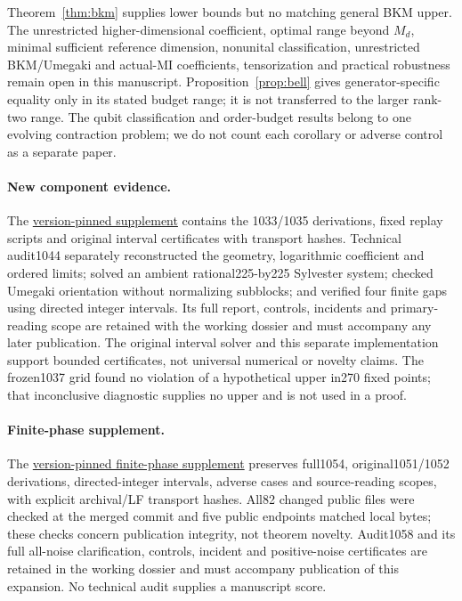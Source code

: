 Theorem~\ref{thm:bkm} supplies lower bounds but no matching general BKM upper. The unrestricted higher-dimensional coefficient, optimal range beyond \(M_d\), minimal sufficient reference dimension, nonunital classification, unrestricted BKM/Umegaki and actual-MI coefficients, tensorization and practical robustness remain open in this manuscript. Proposition~\ref{prop:bell} gives generator-specific equality only in its stated budget range; it is not transferred to the larger rank-two range. The qubit classification and order-budget results belong to one evolving contraction problem; we do not count each corollary or adverse control as a separate paper.

\paragraph{New component evidence.}
The \href{https://github.com/lluiseriksson/physmath-knowledge-tree/tree/34400956487e21509b5196884caa320907b26f58/integrations/research-radar/evidence/2026-10-27-principal-bkm}{version-pinned supplement} contains the 1033/1035 derivations, fixed replay scripts and original interval certificates with transport hashes. Technical audit1044 separately reconstructed the geometry, logarithmic coefficient and ordered limits; solved an ambient rational225-by225 Sylvester system; checked Umegaki orientation without normalizing subblocks; and verified four finite gaps using directed integer intervals. Its full report, controls, incidents and primary-reading scope are retained with the working dossier and must accompany any later publication. The original interval solver and this separate implementation support bounded certificates, not universal numerical or novelty claims. The frozen1037 grid found no violation of a hypothetical upper in270 fixed points; that inconclusive diagnostic supplies no upper and is not used in a proof.

\paragraph{Finite-phase supplement.}
The \href{https://github.com/lluiseriksson/physmath-knowledge-tree/tree/a06b3159420be2f2b0795c4821954ca379ccd3a0/integrations/research-radar/evidence/2026-10-27-local-phase-audit1054}{version-pinned finite-phase supplement} preserves full1054, original1051/1052 derivations, directed-integer intervals, adverse cases and source-reading scopes, with explicit archival/LF transport hashes. All82 changed public files were checked at the merged commit and five public endpoints matched local bytes; these checks concern publication integrity, not theorem novelty. Audit1058 and its full all-noise clarification, controls, incident and positive-noise certificates are retained in the working dossier and must accompany publication of this expansion. No technical audit supplies a manuscript score.

